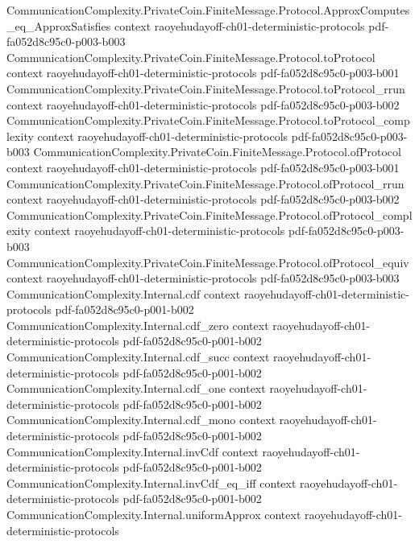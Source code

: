 \begin{theorem}
\proofstep
  {CommunicationComplexity.PrivateCoin.FiniteMessage.Protocol.ApproxComputes_eq_ApproxSatisfies}
  {context}
  {raoyehudayoff-ch01-deterministic-protocols}
  {pdf-fa052d8c95c0-p003-b003}
\proofstep
  {CommunicationComplexity.PrivateCoin.FiniteMessage.Protocol.toProtocol}
  {context}
  {raoyehudayoff-ch01-deterministic-protocols}
  {pdf-fa052d8c95c0-p003-b001}
\proofstep
  {CommunicationComplexity.PrivateCoin.FiniteMessage.Protocol.toProtocol_rrun}
  {context}
  {raoyehudayoff-ch01-deterministic-protocols}
  {pdf-fa052d8c95c0-p003-b002}
\proofstep
  {CommunicationComplexity.PrivateCoin.FiniteMessage.Protocol.toProtocol_complexity}
  {context}
  {raoyehudayoff-ch01-deterministic-protocols}
  {pdf-fa052d8c95c0-p003-b003}
\proofstep
  {CommunicationComplexity.PrivateCoin.FiniteMessage.Protocol.ofProtocol}
  {context}
  {raoyehudayoff-ch01-deterministic-protocols}
  {pdf-fa052d8c95c0-p003-b001}
\proofstep
  {CommunicationComplexity.PrivateCoin.FiniteMessage.Protocol.ofProtocol_rrun}
  {context}
  {raoyehudayoff-ch01-deterministic-protocols}
  {pdf-fa052d8c95c0-p003-b002}
\proofstep
  {CommunicationComplexity.PrivateCoin.FiniteMessage.Protocol.ofProtocol_complexity}
  {context}
  {raoyehudayoff-ch01-deterministic-protocols}
  {pdf-fa052d8c95c0-p003-b003}
\proofstep
  {CommunicationComplexity.PrivateCoin.FiniteMessage.Protocol.ofProtocol_equiv}
  {context}
  {raoyehudayoff-ch01-deterministic-protocols}
  {pdf-fa052d8c95c0-p003-b003}
\proofstep
  {CommunicationComplexity.Internal.cdf}
  {context}
  {raoyehudayoff-ch01-deterministic-protocols}
  {pdf-fa052d8c95c0-p001-b002}
\proofstep
  {CommunicationComplexity.Internal.cdf_zero}
  {context}
  {raoyehudayoff-ch01-deterministic-protocols}
  {pdf-fa052d8c95c0-p001-b002}
\proofstep
  {CommunicationComplexity.Internal.cdf_succ}
  {context}
  {raoyehudayoff-ch01-deterministic-protocols}
  {pdf-fa052d8c95c0-p001-b002}
\proofstep
  {CommunicationComplexity.Internal.cdf_one}
  {context}
  {raoyehudayoff-ch01-deterministic-protocols}
  {pdf-fa052d8c95c0-p001-b002}
\proofstep
  {CommunicationComplexity.Internal.cdf_mono}
  {context}
  {raoyehudayoff-ch01-deterministic-protocols}
  {pdf-fa052d8c95c0-p001-b002}
\proofstep
  {CommunicationComplexity.Internal.invCdf}
  {context}
  {raoyehudayoff-ch01-deterministic-protocols}
  {pdf-fa052d8c95c0-p001-b002}
\proofstep
  {CommunicationComplexity.Internal.invCdf_eq_iff}
  {context}
  {raoyehudayoff-ch01-deterministic-protocols}
  {pdf-fa052d8c95c0-p001-b002}
\proofstep
  {CommunicationComplexity.Internal.uniformApprox}
  {context}
  {raoyehudayoff-ch01-deterministic-protocols}

\end{theorem}
